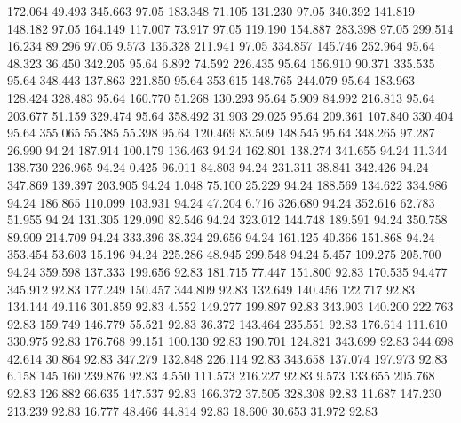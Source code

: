  172.064   49.493  345.663        97.05
 183.348   71.105  131.230        97.05
 340.392  141.819  148.182        97.05
 164.149  117.007   73.917        97.05
 119.190  154.887  283.398        97.05
 299.514   16.234   89.296        97.05
   9.573  136.328  211.941        97.05
 334.857  145.746  252.964        95.64
  48.323   36.450  342.205        95.64
   6.892   74.592  226.435        95.64
 156.910   90.371  335.535        95.64
 348.443  137.863  221.850        95.64
 353.615  148.765  244.079        95.64
 183.963  128.424  328.483        95.64
 160.770   51.268  130.293        95.64
   5.909   84.992  216.813        95.64
 203.677   51.159  329.474        95.64
 358.492   31.903   29.025        95.64
 209.361  107.840  330.404        95.64
 355.065   55.385   55.398        95.64
 120.469   83.509  148.545        95.64
 348.265   97.287   26.990        94.24
 187.914  100.179  136.463        94.24
 162.801  138.274  341.655        94.24
  11.344  138.730  226.965        94.24
   0.425   96.011   84.803        94.24
 231.311   38.841  342.426        94.24
 347.869  139.397  203.905        94.24
   1.048   75.100   25.229        94.24
 188.569  134.622  334.986        94.24
 186.865  110.099  103.931        94.24
  47.204    6.716  326.680        94.24
 352.616   62.783   51.955        94.24
 131.305  129.090   82.546        94.24
 323.012  144.748  189.591        94.24
 350.758   89.909  214.709        94.24
 333.396   38.324   29.656        94.24
 161.125   40.366  151.868        94.24
 353.454   53.603   15.196        94.24
 225.286   48.945  299.548        94.24
   5.457  109.275  205.700        94.24
 359.598  137.333  199.656        92.83
 181.715   77.447  151.800        92.83
 170.535   94.477  345.912        92.83
 177.249  150.457  344.809        92.83
 132.649  140.456  122.717        92.83
 134.144   49.116  301.859        92.83
   4.552  149.277  199.897        92.83
 343.903  140.200  222.763        92.83
 159.749  146.779   55.521        92.83
  36.372  143.464  235.551        92.83
 176.614  111.610  330.975        92.83
 176.768   99.151  100.130        92.83
 190.701  124.821  343.699        92.83
 344.698   42.614   30.864        92.83
 347.279  132.848  226.114        92.83
 343.658  137.074  197.973        92.83
   6.158  145.160  239.876        92.83
   4.550  111.573  216.227        92.83
   9.573  133.655  205.768        92.83
 126.882   66.635  147.537        92.83
 166.372   37.505  328.308        92.83
  11.687  147.230  213.239        92.83
  16.777   48.466   44.814        92.83
  18.600   30.653   31.972        92.83
